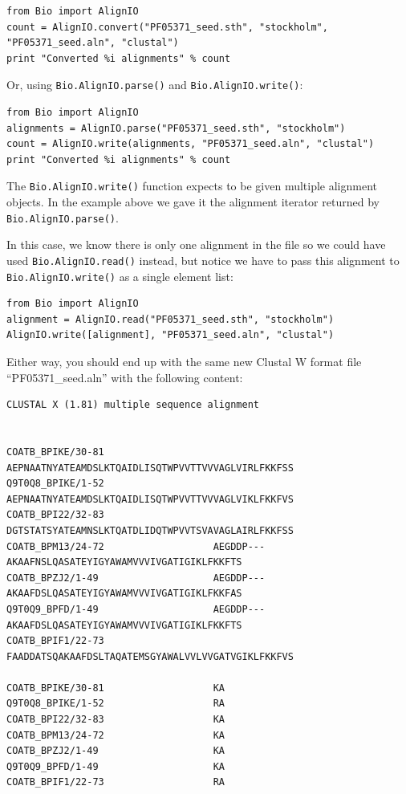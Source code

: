 \documentclass{report}
\begin{document}
\begin{verbatim}
from Bio import AlignIO
count = AlignIO.convert("PF05371_seed.sth", "stockholm", "PF05371_seed.aln", "clustal")
print "Converted %i alignments" % count
\end{verbatim}

Or, using \verb|Bio.AlignIO.parse()| and \verb|Bio.AlignIO.write()|:

\begin{verbatim}
from Bio import AlignIO
alignments = AlignIO.parse("PF05371_seed.sth", "stockholm")
count = AlignIO.write(alignments, "PF05371_seed.aln", "clustal")
print "Converted %i alignments" % count
\end{verbatim}

The \verb|Bio.AlignIO.write()| function expects to be given multiple alignment objects.  In the example above we gave it the alignment iterator returned by \verb|Bio.AlignIO.parse()|.

In this case, we know there is only one alignment in the file so we could have used \verb|Bio.AlignIO.read()| instead, but notice we have to pass this alignment to \verb|Bio.AlignIO.write()| as a single element list:

\begin{verbatim}
from Bio import AlignIO
alignment = AlignIO.read("PF05371_seed.sth", "stockholm")
AlignIO.write([alignment], "PF05371_seed.aln", "clustal")
\end{verbatim}

Either way, you should end up with the same new Clustal W format file ``PF05371\_seed.aln'' with the following content:

\begin{verbatim}
CLUSTAL X (1.81) multiple sequence alignment


COATB_BPIKE/30-81                   AEPNAATNYATEAMDSLKTQAIDLISQTWPVVTTVVVAGLVIRLFKKFSS
Q9T0Q8_BPIKE/1-52                   AEPNAATNYATEAMDSLKTQAIDLISQTWPVVTTVVVAGLVIKLFKKFVS
COATB_BPI22/32-83                   DGTSTATSYATEAMNSLKTQATDLIDQTWPVVTSVAVAGLAIRLFKKFSS
COATB_BPM13/24-72                   AEGDDP---AKAAFNSLQASATEYIGYAWAMVVVIVGATIGIKLFKKFTS
COATB_BPZJ2/1-49                    AEGDDP---AKAAFDSLQASATEYIGYAWAMVVVIVGATIGIKLFKKFAS
Q9T0Q9_BPFD/1-49                    AEGDDP---AKAAFDSLQASATEYIGYAWAMVVVIVGATIGIKLFKKFTS
COATB_BPIF1/22-73                   FAADDATSQAKAAFDSLTAQATEMSGYAWALVVLVVGATVGIKLFKKFVS

COATB_BPIKE/30-81                   KA
Q9T0Q8_BPIKE/1-52                   RA
COATB_BPI22/32-83                   KA
COATB_BPM13/24-72                   KA
COATB_BPZJ2/1-49                    KA
Q9T0Q9_BPFD/1-49                    KA
COATB_BPIF1/22-73                   RA
\end{verbatim}
\end{document}
